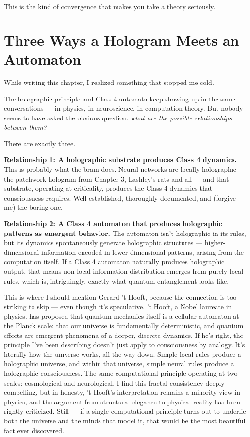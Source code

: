 \documentclass[11pt, twoside, openright]{book}
\begin{document}
This is the kind of convergence that makes you take a theory seriously.

\section*{Three Ways a Hologram Meets an Automaton}

While writing this chapter, I realized something that stopped me cold.

The holographic principle and Class 4 automata keep showing up in the same conversations --- in physics, in neuroscience, in computation theory. But nobody seems to have asked the obvious question: \textit{what are the possible relationships between them?}

There are exactly three.

\textbf{Relationship 1: A holographic substrate produces Class 4 dynamics.} This is probably what the brain does. Neural networks are locally holographic --- the patchwork hologram from Chapter 3, Lashley's rats and all --- and that substrate, operating at criticality, produces the Class 4 dynamics that consciousness requires. Well-established, thoroughly documented, and (forgive me) the boring one.

\textbf{Relationship 2: A Class 4 automaton that produces holographic patterns as emergent behavior.} The automaton isn't holographic in its rules, but its dynamics spontaneously generate holographic structures --- higher-dimensional information encoded in lower-dimensional patterns, arising from the computation itself. If a Class 4 automaton naturally produces holographic output, that means non-local information distribution emerges from purely local rules, which is, intriguingly, exactly what quantum entanglement looks like.

This is where I should mention Gerard 't Hooft, because the connection is too striking to skip --- even though it's speculative. 't Hooft, a Nobel laureate in physics, has proposed that quantum mechanics itself is a cellular automaton at the Planck scale: that our universe is fundamentally deterministic, and quantum effects are emergent phenomena of a deeper, discrete dynamics. If he's right, the principle I've been describing doesn't just apply to consciousness by analogy. It's literally how the universe works, all the way down. Simple local rules produce a holographic universe, and within that universe, simple neural rules produce a holographic consciousness. The same computational principle operating at two scales: cosmological and neurological. I find this fractal consistency deeply compelling, but in honesty, 't Hooft's interpretation remains a minority view in physics, and the argument from structural elegance to physical reality has been rightly criticized. Still --- if a single computational principle turns out to underlie both the universe and the minds that model it, that would be the most beautiful fact ever discovered.
\end{document}
